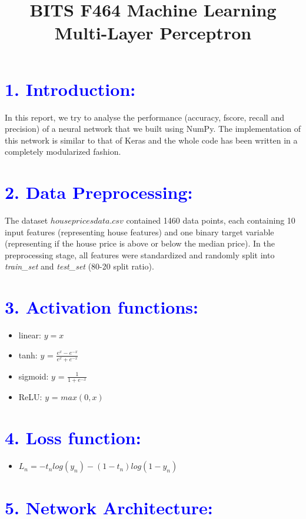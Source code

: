 \documentclass[a4paper,10pt,twoside]{article}
\title
{
\LARGE BITS F464 Machine Learning \\
\LARGE Multi-Layer Perceptron
}
\date{}
\author{}
\begin{document}
\maketitle
\section*{\textcolor{blue}{1. Introduction:}}
In this report, we try to analyse the performance (accuracy, fscore, recall and precision) of a neural network that we built using NumPy. The implementation of this network is similar to that of Keras and the whole code has been written in a completely modularized fashion.

\section*{\textcolor{blue}{2. Data Preprocessing:}}
The dataset $housepricesdata.csv$ contained 1460 data points, each containing 10 input features (representing house features) and one binary target variable (representing if the house price is above or below the median price). In the preprocessing stage, all features were standardized and randomly split into \textit{train\_set} and \textit{test\_set} (80-20 split ratio).

\section*{\textcolor{blue}{3. Activation functions:}}
\begin{itemize}
\item{linear: $y = x$}
\item{tanh: $y$ = $\frac{e^x - e^{-x}}{e^x + e^{-x}}$}
\item{sigmoid: $y$ = $\frac{1}{1 + e^{-x}}$}
\item{ReLU: $y$ = $max(0, x)$}
\end{itemize}

\section*{\textcolor{blue}{4. Loss function:}}
\begin{itemize}
\item{$L_n = -t_nlog(y_n)-(1-t_n)log(1-y_n)$} 
\end{itemize}

\section*{\textcolor{blue}{5. Network Architecture:}}
\end{document}
